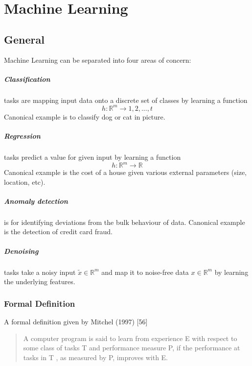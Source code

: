 \chapter[Machine Learning]{Machine Learning}
\label{ch:ml}


\section{General}

Machine Learning can be separated into four areas of concern:
\paragraph{Classification} tasks are mapping input data onto a discrete set of
classes by learning a function $$ h:\mathbb{R}^m\rightarrow{1,2,...,t}
$$
Canonical example is to classify dog or cat in picture.

\paragraph{Regression} tasks  predict a value for given input by learning a function $$
h:\mathbb{R}^m\rightarrow\mathbb{R}
$$
Canonical example is the cost of a house given various external parameters (size, location, etc).

\paragraph{Anomaly detection} is for identifying deviations from the bulk behaviour of data. 
Canonical example is the detection of credit card fraud.
 
\paragraph{Denoising} tasks take a noisy input $\tilde{x}\in\mathbb{R}^m$ and map it to noise-free data $x\in\mathbb{R}^m$ by learning the underlying features.

\subsection{Formal Definition}
A formal definition given by Mitchel (1997) [56] 
\begin{quote}
  A computer program is said to learn from experience E with respect to some class of tasks T and performance measure P, 
  if the performance at tasks in T , as measured by P, improves with E.
\end{quote}

